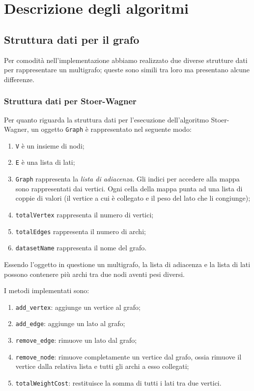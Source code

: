 \section{Descrizione degli algoritmi}

\subsection{Struttura dati per il grafo}

Per comodità nell'implementazione abbiamo realizzato due diverse strutture dati per rappresentare un multigrafo; queste sono simili tra loro ma presentano alcune differenze.

\subsubsection{Struttura dati per Stoer-Wagner}
Per quanto riguarda la struttura dati per l'esecuzione dell'algoritmo Stoer-Wagner, un oggetto \texttt{Graph} è rappresentato nel seguente modo:

\begin{enumerate}
    \item \verb|V| è un insieme di nodi;
    \item \verb|E| è una lista di lati;
    \item \verb|Graph| rappresenta la \textit{lista di adiacenza}.
    Gli indici per accedere alla mappa sono rappresentati dai vertici.
    Ogni cella della mappa punta ad una lista di coppie di valori
    (il vertice a cui è collegato e il peso del lato che li
    congiunge);
    \item \verb|totalVertex| rappresenta il numero di vertici;
    \item \verb|totalEdges| rappresenta il numero di archi;
    \item \verb|datasetName| rappresenta il nome del grafo.
\end{enumerate}
Essendo l'oggetto in questione un multigrafo, la lista di adiacenza e la lista di lati possono contenere più archi tra due nodi aventi pesi diversi.

\noindent I metodi implementati sono:
\begin{enumerate}
    \item \verb|add_vertex|: aggiunge un vertice al grafo;
    \item \verb|add_edge|: aggiunge un lato al grafo;
    \item \verb|remove_edge|: rimuove un lato dal grafo;
    \item \verb|remove_node|: rimuove completamente un vertice dal grafo, ossia rimuove il vertice dalla relativa lista e tutti gli archi a esso collegati;
    \item \verb|totalWeightCost|: restituisce la somma di tutti i lati tra due vertici.
\end{enumerate}

